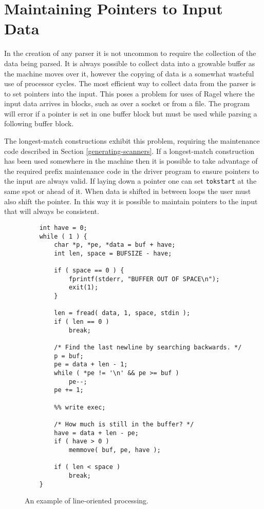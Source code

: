 \documentclass[letterpaper,11pt,oneside]{book}
\begin{document}
\section{Maintaining Pointers to Input Data}

In the creation of any parser it is not uncommon to require the collection of
the data being parsed.  It is always possible to collect data into a growable
buffer as the machine moves over it, however the copying of data is a somewhat
wasteful use of processor cycles. The most efficient way to collect data
from the parser is to set pointers into the input. This poses a problem for
uses of Ragel where the input data arrives in blocks, such as over a socket or
from a file. The program will error if a pointer is set in one buffer block but
must be used while parsing a following buffer block.

The longest-match constructions exhibit this problem, requiring the maintenance
code described in Section \ref{generating-scanners}. If a longest-match
construction has been used somewhere in the machine then it is possible to
take advantage of the required prefix maintenance code in the driver program to
ensure pointers to the input are always valid. If laying down a pointer one can
set \verb|tokstart| at the same spot or ahead of it. When data is shifted in
between loops the user must also shift the pointer.  In this way it is possible
to maintain pointers to the input that will always be consistent.

\begin{figure}
\small
\begin{verbatim}
    int have = 0;
    while ( 1 ) {
        char *p, *pe, *data = buf + have;
        int len, space = BUFSIZE - have;

        if ( space == 0 ) { 
            fprintf(stderr, "BUFFER OUT OF SPACE\n");
            exit(1);
        }

        len = fread( data, 1, space, stdin );
        if ( len == 0 )
            break;

        /* Find the last newline by searching backwards. */
        p = buf;
        pe = data + len - 1;
        while ( *pe != '\n' && pe >= buf )
            pe--;
        pe += 1;

        %% write exec;

        /* How much is still in the buffer? */
        have = data + len - pe;
        if ( have > 0 )
            memmove( buf, pe, have );

        if ( len < space )
            break;
    }
\end{verbatim}
\caption{An example of line-oriented processing.}
\label{line-oriented}
\end{figure}
\end{document}
